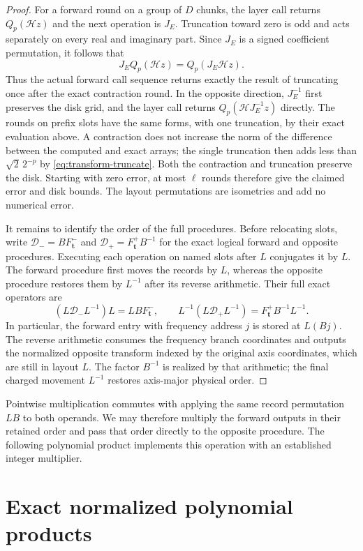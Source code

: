 \begin{proof}
For a forward round on a group of $D$ chunks, the layer call returns
$Q_p(\mathcal H z)$ and the next operation is $J_E$.  Truncation
toward zero is odd and acts separately on every real and imaginary
part.  Since $J_E$ is a signed coefficient permutation, it follows
that
\[
       J_EQ_p(\mathcal H z)=Q_p(J_E\mathcal H z).
\]
Thus the actual forward call sequence returns exactly the result of
truncating once after the exact contraction round.  In the opposite
direction, $J_E^{-1}$
first preserves the disk grid, and the layer call returns
$Q_p(\mathcal HJ_E^{-1}z)$ directly.  The rounds on prefix slots
have the same forms, with one truncation, by their exact evaluation
above.  A contraction does not increase the norm of the difference
between the computed and exact arrays; the single truncation then
adds less than $\sqrt2\,2^{-p}$ by \eqref{eq:transform-truncate}.
Both the contraction and truncation preserve the disk.  Starting with
zero error, at most $\ell$ rounds therefore
give the claimed error and disk bounds.  The layout permutations
are isometries and add no numerical error.

It remains to identify the order of the full procedures.  Before
relocating slots, write
$\mathcal D_-=BF_{\boldsymbol t}^-$ and
$\mathcal D_+=F_{\boldsymbol t}^+B^{-1}$ for the exact logical forward and
opposite procedures.  Executing each operation on named slots after $L$
conjugates it by $L$.  The forward procedure first moves the records
by $L$, whereas the opposite procedure restores them by $L^{-1}$
after its reverse arithmetic.  Their full exact operators are
\[
 (L\mathcal D_-L^{-1})L=LB F_{\boldsymbol t}^-,
 \qquad
 L^{-1}(L\mathcal D_+L^{-1})
       =F_{\boldsymbol t}^+B^{-1}L^{-1}.
\]
In particular, the forward entry with frequency address $j$ is
stored at $L(Bj)$.  The reverse arithmetic consumes the frequency
branch coordinates and outputs the normalized opposite transform
indexed by the original axis coordinates, which are still in layout $L$.
The factor $B^{-1}$ is realized by that arithmetic; the final
charged movement $L^{-1}$ restores axis-major physical order.
\end{proof}

Pointwise multiplication commutes with applying the same record
permutation $LB$ to both operands.  We may therefore multiply the
forward outputs in their retained order and pass that order directly
to the opposite procedure.  The following polynomial product
implements this operation with an established integer multiplier.

\section{Exact normalized polynomial products}
\label{sec:exact-ring-products}

